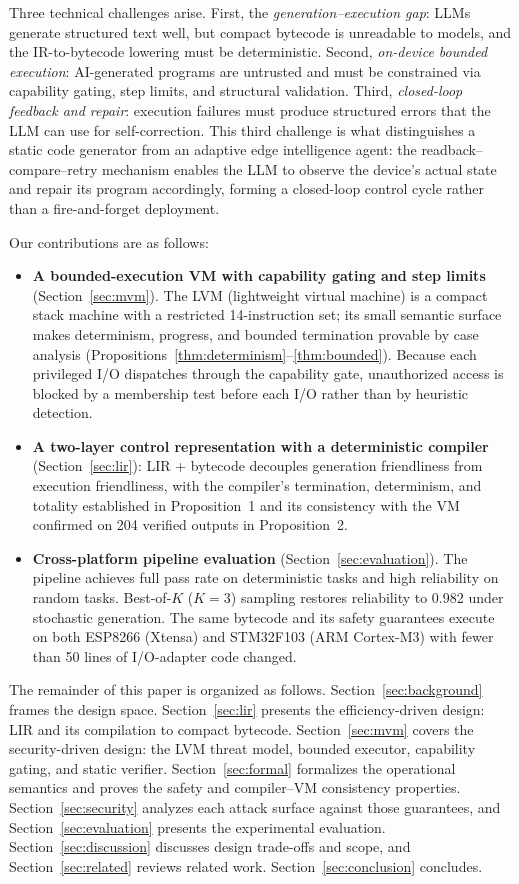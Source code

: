 \documentclass[a4paper,fleqn,longmktitle]{cas-dc}
\begin{document}
Three technical challenges arise. First, the \emph{generation--execution gap}: LLMs generate structured text well, but compact bytecode is unreadable to models, and the IR-to-bytecode lowering must be deterministic. Second, \emph{on-device bounded execution}: AI-generated programs are untrusted and must be constrained via capability gating, step limits, and structural validation. Third, \emph{closed-loop feedback and repair}: execution failures must produce structured errors that the LLM can use for self-correction. This third challenge is what distinguishes a static code generator from an adaptive edge intelligence agent: the readback--compare--retry mechanism enables the LLM to observe the device's actual state and repair its program accordingly, forming a closed-loop control cycle rather than a fire-and-forget deployment.

Our contributions are as follows:
\begin{itemize}
  \item \textbf{A bounded-execution VM with capability gating and step limits} (Section~\ref{sec:mvm}). The LVM (lightweight virtual machine) is a compact stack machine with a restricted 14-instruction set; its small semantic surface makes determinism, progress, and bounded termination provable by case analysis (Propositions~\ref{thm:determinism}--\ref{thm:bounded}). Because each privileged I/O dispatches through the capability gate, unauthorized access is blocked by a membership test before each I/O rather than by heuristic detection.
  \item \textbf{A two-layer control representation with a deterministic compiler} (Section~\ref{sec:lir}): LIR + bytecode decouples generation friendliness from execution friendliness, with the compiler's termination, determinism, and totality established in Proposition~1 and its consistency with the VM confirmed on 204 verified outputs in Proposition~2.
  \item \textbf{Cross-platform pipeline evaluation} (Section~\ref{sec:evaluation}). The pipeline achieves full pass rate on deterministic tasks and high reliability on random tasks. Best-of-$K$ ($K{=}3$) sampling restores reliability to 0.982 under stochastic generation. The same bytecode and its safety guarantees execute on both ESP8266 (Xtensa) and STM32F103 (ARM Cortex-M3) with fewer than 50 lines of I/O-adapter code changed.
\end{itemize}

The remainder of this paper is organized as follows. Section~\ref{sec:background} frames the design space. Section~\ref{sec:lir} presents the efficiency-driven design: LIR and its compilation to compact bytecode. Section~\ref{sec:mvm} covers the security-driven design: the LVM threat model, bounded executor, capability gating, and static verifier. Section~\ref{sec:formal} formalizes the operational semantics and proves the safety and compiler--VM consistency properties. Section~\ref{sec:security} analyzes each attack surface against those guarantees, and Section~\ref{sec:evaluation} presents the experimental evaluation. Section~\ref{sec:discussion} discusses design trade-offs and scope, and Section~\ref{sec:related} reviews related work. Section~\ref{sec:conclusion} concludes.
\end{document}
